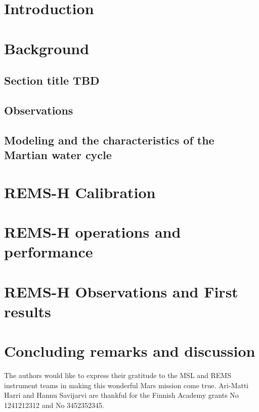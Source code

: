 \documentclass[draft, jgrga]{agutex}
\begin{document}
\begin{article}

\section{Introduction}\label{sec:Intro}

\section{Background}\label{sec:Background}

\subsection{Section title TBD}

\subsection{Observations}

\subsection{Modeling and the characteristics of the Martian water cycle}



\section{REMS-H Calibration}\label{sec:REMSHCalibration}


\section{REMS-H operations and performance}\label{sec:REMSHOpsPerf}


\section{REMS-H Observations and First results}\label{sec:REMSHObsResults}



\section{Concluding remarks and discussion}\label{sec:Conclusions}






\begin{acknowledgments}

The authors would like to express their gratitude to the MSL and REMS instrument teams in making this wonderful Mars mission come true. Ari-Matti Harri and Hannu Savijarvi are thankful for the Finnish Academy grants No 1241212312 and  No 3452352345.

\end{acknowledgments}


\end{article}
\end{document}
